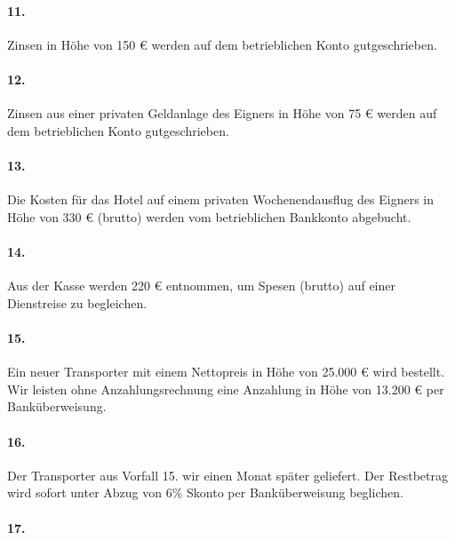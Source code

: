 \documentclass[paper=a4, fontsize=11pt]{scrartcl}
\numberwithin{equation}{section}
\numberwithin{figure}{section}
\numberwithin{table}{section}
\begin{document}
{\paragraph{11.}

Zinsen in Höhe von 150 € werden auf dem betrieblichen Konto gutgeschrieben. \\

\paragraph{12.}

Zinsen aus einer privaten Geldanlage des Eigners in Höhe von 75 € werden auf dem betrieblichen Konto gutgeschrieben. \\

\paragraph{13.}

Die Kosten für das Hotel auf einem privaten Wochenendausflug des Eigners in Höhe von 330 € (brutto) werden vom betrieblichen Bankkonto abgebucht. \\

\paragraph{14.}

Aus der Kasse werden 220 € entnommen, um Spesen (brutto) auf einer Dienstreise zu begleichen. \\

\paragraph{15.}

Ein neuer Transporter mit einem Nettopreis in Höhe von 25.000 € wird bestellt. Wir leisten ohne Anzahlungsrechnung eine Anzahlung in Höhe von 13.200 € per Banküberweisung. \\

\paragraph{16.}

Der Transporter aus Vorfall 15. wir einen Monat später geliefert. Der Restbetrag wird sofort unter Abzug von $6 \%$ Skonto per Banküberweisung beglichen. \\

\paragraph{17.}

}
\end{document}
